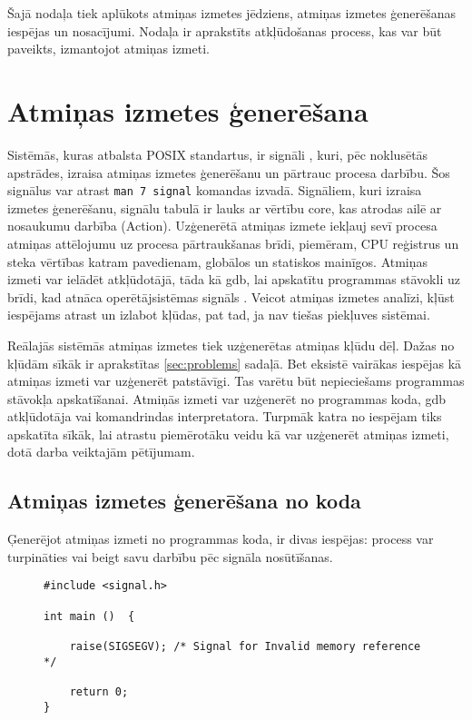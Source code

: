 ﻿Šajā nodaļa tiek aplūkots atmiņas izmetes jēdziens, atmiņas izmetes ģenerēšanas iespējas un nosacījumi.
Nodaļa ir aprakstīts atkļūdošanas process, kas var būt paveikts, izmantojot atmiņas izmeti.

 \section{Atmiņas izmetes ģenerēšana}
Sistēmās, kuras atbalsta POSIX standartus, ir signāli \cite{USP}, kuri, pēc noklusētās apstrādes, izraisa atmiņas izmetes ģenerēšanu un pārtrauc procesa darbību. 
Šos signālus var atrast  \texttt{man 7 signal} komandas izvadā. 
Signāliem, kuri izraisa izmetes ģenerēšanu, signālu tabulā \cite{signal} ir lauks ar vērtību core, kas atrodas ailē ar nosaukumu darbība (Action). 
Uzģenerētā atmiņas izmete iekļauj sevī procesa atmiņas attēlojumu uz procesa pārtraukšanas brīdi, piemēram, CPU reģistrus un steka vērtības katram pavedienam, globālos un statiskos mainīgos. 
Atmiņas izmeti var ielādēt atkļūdotājā, tāda kā gdb, lai  apskatītu programmas stāvokli uz brīdi, kad atnāca operētājsistēmas signāls \cite{core}.
Veicot atmiņas izmetes analīzi, kļūst iespējams atrast un izlabot kļūdas, pat tad, ja nav tiešas piekļuves sistēmai. 

Reālajās sistēmās atmiņas izmetes tiek uzģenerētas atmiņas kļūdu dēļ. 
Dažas no kļūdām sīkāk ir aprakstītas \ref{sec:problems} sadaļā. 
Bet eksistē vairākas iespējas kā atmiņas izmeti var uzģenerēt patstāvīgi.
Tas varētu būt nepieciešams programmas stāvokļa apskatīšanai.
Atmiņās izmeti var uzģenerēt no programmas koda,  gdb atkļūdotāja vai komandrindas interpretatora.
Turpmāk katra no iespējam tiks apskatīta sīkāk, lai atrastu piemērotāku veidu kā var uzģenerēt atmiņas izmeti, dotā darba veiktajām pētījumam.

\subsection{Atmiņas izmetes ģenerēšana no koda}
Ģenerējot atmiņas izmeti no programmas koda, ir divas iespējas: process var turpināties vai beigt savu darbību pēc signāla nosūtīšanas.
\begin{figure}[h]
\begin{lstlisting}
#include <signal.h>

int main ()  {

    raise(SIGSEGV); /* Signal for Invalid memory reference */
	
    return 0;
}
\end{lstlisting}
\caption{\textbf{\fontsize{11}{12}\selectfont {Atmiņas izmetes ģenerēšana, pārtraucot procesa darbību}}}
\end{figure}

